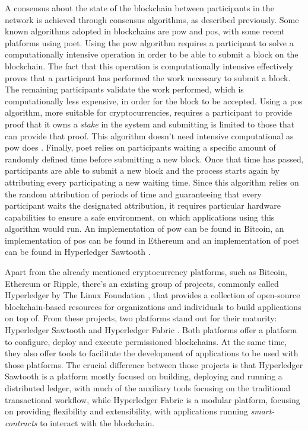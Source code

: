 A consensus about the state of the blockchain between participants in the network is achieved through consensus algorithms, as described previously. Some known algorithms adopted in blockchains are \gls{pow} and \gls{pos}, with some recent platforms using \gls{poet}. Using the \gls{pow} algorithm requires a participant to solve a computationally intensive operation\cite{nakamoto_bitcoin:_2008, yaga_blockchain_2018} in order to be able to submit a block on the blockchain. The fact that this operation is computationally intensive effectively proves that a participant has performed the work necessary to submit a block. The remaining participants validate the work performed, which is computationally less expensive, in order for the block to be accepted. Using a \gls{pos} algorithm, more suitable for cryptocurrencies, requires a participant to provide proof that it owns a \emph{stake} in the system and submitting is limited to those that can provide that proof. This algorithm doesn't need intensive computational as \gls{pow} does \cite{yaga_blockchain_2018}. Finally, \gls{poet} relies on participants waiting a specific amount of randomly defined time before submitting a new block. Once that time has passed, participants are able to submit a new block and the process starts again by attributing every participating a new waiting time. Since this algorithm relies on the random attribution of periods of time and guaranteeing that every participant waits the designated attribution, it requires particular hardware capabilities to ensure a safe environment, on which applications using this algorithm would run. An implementation of \gls{pow} can be found in Bitcoin, an implementation of \gls{pos} can be found in Ethereum and an implementation of \gls{poet} can be found in Hyperledger Sawtooth \cite{yaga_blockchain_2018}.

Apart from the already mentioned cryptocurrency platforms, such as Bitcoin, Ethereum or Ripple, there's an existing group of projects, commonly called Hyperledger \cite{hyperledger} by The Linux Foundation \cite{linuxfoundation}, that provides a collection of open-source blockchain-based resources for organizations and individuals to build applications on top of. From these projects, two platforms stand out for their maturity: Hyperledger Sawtooth \cite{hyperledger_sawtooth} and Hyperledger Fabric \cite{hyperledger_fabric}. Both platforms offer a platform to configure, deploy and execute permissioned blockchains. At the same time, they also offer tools to facilitate the development of applications to be used with those platforms. The crucial difference between those projects is that Hyperledger Sawtooth is a platform mostly focused on building, deploying and running a distributed ledger, with much of the auxiliary tools focusing on the traditional transactional workflow, while Hyperledger Fabric is a modular platform, focusing on providing flexibility and extensibility, with applications running \emph{smart-contracts} to interact with the blockchain.

